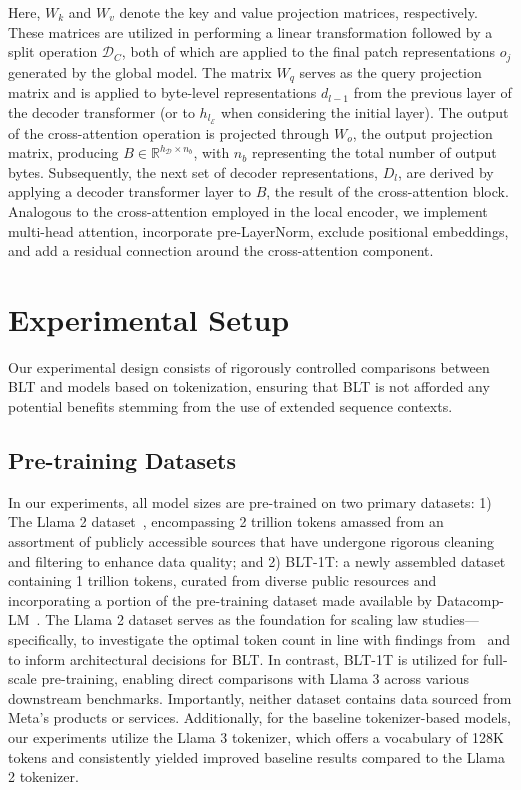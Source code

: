 Here, $W_k$ and $W_v$ denote the key and value projection matrices, respectively. These matrices are utilized in performing a linear transformation followed by a split operation $\mathcal{D}_C$, both of which are applied to the final patch representations $o_j$ generated by the global model. The matrix $W_q$ serves as the query projection matrix and is applied to byte-level representations $d_{l-1}$ from the previous layer of the decoder transformer (or to $h_{l_{\mathcal{E}}}$ when considering the initial layer). The output of the cross-attention operation is projected through $W_o$, the output projection matrix, producing $B \in \mathbb{R}^{h_{\mathcal{D}} \times n_b}$, with $n_b$ representing the total number of output bytes. Subsequently, the next set of decoder representations, $D_l$, are derived by applying a decoder transformer layer to $B$, the result of the cross-attention block. Analogous to the cross-attention employed in the local encoder, we implement multi-head attention, incorporate pre-LayerNorm, exclude positional embeddings, and add a residual connection around the cross-attention component.

\section{Experimental Setup}
\label{section:experiments}
Our experimental design consists of rigorously controlled comparisons between {\textsc BLT} and models based on tokenization, ensuring that {\textsc BLT} is not afforded any potential benefits stemming from the use of extended sequence contexts.

\subsection{Pre-training Datasets} In our experiments, all model sizes are pre-trained on two primary datasets: 1) The Llama 2 dataset~\citep{touvron2023llama}, encompassing 2 trillion tokens amassed from an assortment of publicly accessible sources that have undergone rigorous cleaning and filtering to enhance data quality; and 2) {\textsc BLT}-1T: a newly assembled dataset containing 1 trillion tokens, curated from diverse public resources and incorporating a portion of the pre-training dataset made available by Datacomp-LM~\citep{li2024datacomp}. The Llama 2 dataset serves as the foundation for scaling law studies—specifically, to investigate the optimal token count in line with findings from~\cite{dubey2024llama} and to inform architectural decisions for {\textsc BLT}. In contrast, {\textsc BLT}-1T is utilized for full-scale pre-training, enabling direct comparisons with Llama 3 across various downstream benchmarks. Importantly, neither dataset contains data sourced from Meta’s products or services. Additionally, for the baseline tokenizer-based models, our experiments utilize the Llama 3 tokenizer, which offers a vocabulary of 128K tokens and consistently yielded improved baseline results compared to the Llama 2 tokenizer.

